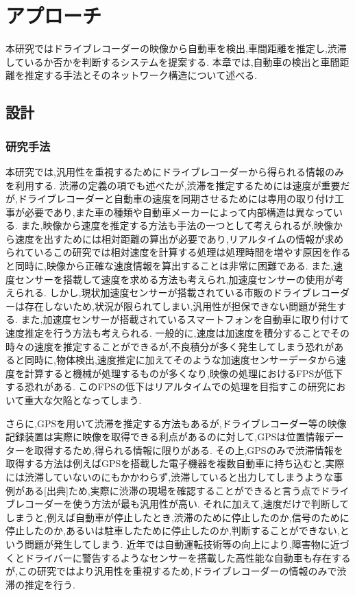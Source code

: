 \chapter{アプローチ}
本研究ではドライブレコーダーの映像から自動車を検出,車間距離を推定し,渋滞しているか否かを判断するシステムを提案する.
本章では,自動車の検出と車間距離を推定する手法とそのネットワーク構造について述べる.

\newpage

\section{設計}
\subsection{研究手法}
本研究では,汎用性を重視するためにドライブレコーダーから得られる情報のみを利用する.
渋滞の定義の項でも述べたが,渋滞を推定するためには速度が重要だが,ドライブレコーダーと自動車の速度を同期させるためには専用の取り付け工事が必要であり,また車の種類や自動車メーカーによって内部構造は異なっている.
また,映像から速度を推定する方法も手法の一つとして考えられるが,映像から速度を出すためには相対距離の算出が必要であり,リアルタイムの情報が求められているこの研究では相対速度を計算する処理は処理時間を増やす原因を作ると同時に,映像から正確な速度情報を算出することは非常に困難である.
また,速度センサーを搭載して速度を求める方法も考えられ,加速度センサーの使用が考えられる.
しかし,現状加速度センサーが搭載されている市販のドライブレコーダーは存在しないため,状況が限られてしまい,汎用性が担保できない問題が発生する.
また,加速度センサーが搭載されているスマートフォンを自動車に取り付けて速度推定を行う方法も考えられる.
一般的に,速度は加速度を積分することでその時々の速度を推定することができるが,不良積分が多く発生してしまう恐れがあると同時に,物体検出,速度推定に加えてそのような加速度センサーデータから速度を計算すると機械が処理するものが多くなり,映像の処理におけるFPSが低下する恐れがある.
このFPSの低下はリアルタイムでの処理を目指すこの研究において重大な欠陥となってしまう.

さらに,GPSを用いて渋滞を推定する方法もあるが,ドライブレコーダー等の映像記録装置は実際に映像を取得できる利点があるのに対して,GPSは位置情報データーを取得するため,得られる情報に限りがある.
その上,GPSのみで渋滞情報を取得する方法は例えばGPSを搭載した電子機器を複数自動車に持ち込むと,実際には渋滞していないのにもかかわらず,渋滞していると出力してしまうような事例がある[出典]ため,実際に渋滞の現場を確認することができると言う点でドライブレコーダーを使う方法が最も汎用性が高い.
それに加えて,速度だけで判断してしまうと,例えば自動車が停止したとき,渋滞のために停止したのか,信号のために停止したのか,あるいは駐車したために停止したのか,判断することができない,という問題が発生してしまう.
近年では自動運転技術等の向上により,障害物に近づくとドライバーに警告するようなセンサーを搭載した高性能な自動車も存在するが,この研究ではより汎用性を重視するため,ドライブレコーダーの情報のみで渋滞の推定を行う.

